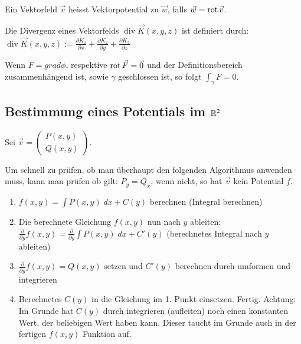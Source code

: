 \begin{definition}[Vektorpotential]
Ein Vektorfeld $\vec{v}$ heisst Vektorpotential zu $\vec{w}$, falls $\vec{w} = \operatorname{rot} \vec{v}$.
\end{definition}

\begin{definition}[Divergenz]
Die Divergenz eines Vektorfelds $\operatorname{div} \vec{K}(x,y,z)$ ist definiert durch:
$\operatorname{div} \vec{K}(x,y,z) := \frac{\partial
K_1}{\partial x} + \frac{\partial K_2}{\partial y} + \frac{\partial
K_3}{\partial z}$
\end{definition}

\begin{lemma}
Wenn $F = grad \phi$, respektive $\operatorname{rot} \vec{F} =\vec{0}$ und der Definitionsbereich zusammenhängend ist,
sowie $\gamma$ geschlossen ist, so folgt $\int_\gamma F = 0$.
\end{lemma}

\subsection{Bestimmung eines Potentials im $\mathbb{R}^2$}
Sei $\vec{v} = \begin{pmatrix}
P(x,y)\\
Q(x,y)
\end{pmatrix}$.

Um schnell zu prüfen, ob man überhaupt den folgenden Algorithmus anwenden muss,
kann man prüfen ob gilt: $P_y = Q_x$, wenn nicht, so hat $\vec{v}$ kein Potential $f$.

\begin{enumerate}[itemsep=1em]
	\item $f(x,y) = \int P(x,y)\;dx + C(y)$ berechnen (Integral berechnen)
	\item Die berechnete Gleichung $f(x,y)$ nun nach $y$ ableiten:
	$\frac{\partial}{\partial y} f(x,y) = \frac{\partial}{\partial y}\int P(x,y)\;dx + C'(y)$
	(berechnetes Integral nach $y$ ableiten)
	\item $\frac{\partial}{\partial y} f(x,y) = Q(x,y)$ setzen und $C'(y)$ berechnen durch umformen
	und integrieren
	\item Berechnetes $C(y)$ in die Gleichung im 1. Punkt einsetzen. Fertig. Achtung: Im Grunde hat
	$C(y)$ durch integrieren (aufleiten) noch einen konstanten Wert, der beliebigen Wert haben kann.
	Dieser taucht im Grunde auch in der fertigen $f(x,y)$ Funktion auf.
\end{enumerate}

